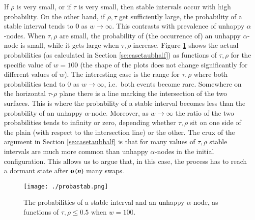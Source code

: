 \documentclass[11pt]{article}
\theoremstyle{plain}
\numberwithin{equation}{subsection}
\newcommand{\smo}[1]{\mathop{\bf o}\/\left({#1}\right)}
\begin{document}
If $\rho$ is very small, or if $\tau$ is very small, then stable intervals occur with high probability. 
On the other hand, if $\rho,\tau$ get sufficiently large,
the probability of a stable interval tends to 0 as $w\to\infty$.
This contrasts with prevalence of unhappy $\alpha$-nodes. When $\tau, \rho$ are small,
the probability of (the occurrence of) an unhappy $\alpha$-node is small, while it gets large
when $\tau, \rho$ increase. Figure \ref{fig:proba_unhap_stabl} shows
the actual probabilities (as calculated in Section \ref{se:casetaubhalf}) as functions
of $\tau,\rho$ for the specific value of $w=100$ (the shape of the plots does not 
change significantly for
different values of $w$). 
The interesting case is the range for $\tau,\rho$ where both probabilities tend to $0$ as
$w\to\infty$, i.e.\ both events become rare. Somewhere on the horizontal $\tau$-$\rho$ plane
there is a line marking the intersection of the two surfaces.
This is where the probability of a stable interval becomes less than the probability of an unhappy
$\alpha$-node. Moreover, as $w\to\infty$ the ratio of the two probabilities tends to infinity or zero,
depending whether $\tau,\rho$ sit on one side of the plain (with respect to the intersection line)
or the other. 
The crux of the argument in Section \ref{se:casetaubhalf}  is that for many values of 
$\tau,\rho$ stable intervals are much more common than unhappy $\alpha$-nodes in the
initial configuration. This allows us to argue that, in this case, 
the process has to reach a dormant state after 
$\smo{n}$ many swaps. 

 \begin{figure}  \centering
\texttt{[image: ./probastab.png]}
\caption{The probabilities of a stable interval and an 
unhappy $\alpha$-node, as functions of $\tau,\rho\leq 0.5$ when $w=100$.}
\label{fig:proba_unhap_stabl}
\end{figure}  
\end{document}
